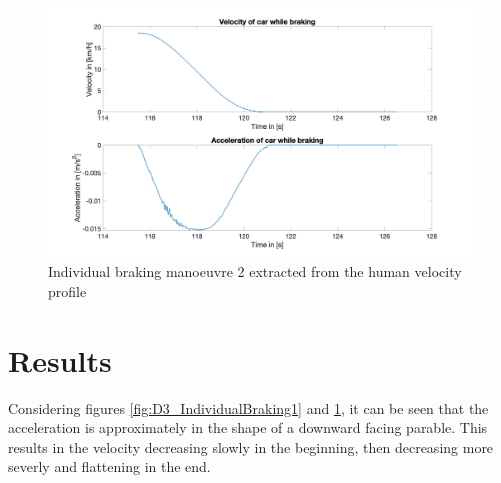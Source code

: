 \begin{figure}[H]
\centering
\includegraphics[width=1\textwidth]{images/D3_example2.jpg}
\caption{Individual braking manoeuvre 2 extracted from the human velocity profile}
\label{fig:D3_IndividualBraking2}
\end{figure}

\section{Results}
Considering figures \ref{fig:D3_IndividualBraking1} and \ref{fig:D3_IndividualBraking2}, it can be seen that the acceleration is approximately in the shape of a downward facing parable. This results in the velocity decreasing slowly in the beginning, then decreasing more severly and flattening in the end.   

%
%
%

